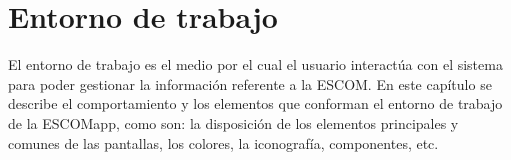 
\section{Entorno de trabajo}

    El entorno de trabajo es el medio por el cual el usuario interactúa con el sistema para poder gestionar la información referente a la ESCOM. En este capítulo se describe el comportamiento y los elementos que conforman el entorno de trabajo de la ESCOMapp, como son: la disposición de los elementos principales y comunes de las pantallas, los colores, la iconografía, componentes, etc. \bigskip


